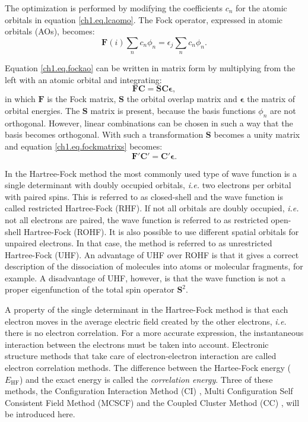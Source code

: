 The optimization is performed by modifying the coefficients $c_n$ for the atomic orbitals in equation \ref{ch1.eq.lcaomo}. The Fock operator, expressed in atomic orbitals (AOs), becomes:
\begin{equation}
\mathbf{F}(i)\sum_n c_n \phi_n = \epsilon_j \sum_n c_n \phi_n.
\label{ch1.eq.fockao}
\end{equation}

Equation \ref{ch1.eq.fockao} can be written in matrix form by multiplying from the left with an atomic orbital and integrating:
\begin{equation}
\mathbf{F}\mathbf{C} = \mathbf{S}\mathbf{C}\mathbf{\epsilon},
\label{ch1.eq.fockmatrixs}
\end{equation}
in which $\mathbf{F}$ is the Fock matrix, $\mathbf{S}$ the orbital overlap matrix and $\mathbf{\epsilon}$ the matrix of orbital energies. The $\mathbf{S}$ matrix is present, because the basis functions $\phi_n$ are not orthogonal. However, linear combinations can be chosen in such a way that the basis becomes orthogonal. With such a transformation $\mathbf{S}$ becomes a unity matrix and equation \ref{ch1.eq.fockmatrixs} becomes:
\begin{equation}
\mathbf{F'}\mathbf{C'} = \mathbf{C'}\mathbf{\epsilon}.
\end{equation}

In the Hartree-Fock method the most commonly used type of wave function is a single determinant with doubly occupied orbitals, \textit{i.e.} two electrons per orbital with paired spins. This is referred to as closed-shell and the wave function is called restricted Hartree-Fock (RHF). If not all orbitals are doubly occupied, \textit{i.e.} not all electrons are paired, the wave function is referred to as restricted open-shell Hartree-Fock (ROHF). It is also possible to use different spatial orbitals for unpaired electrons. In that case, the method is referred to as unrestricted Hartree-Fock (UHF). An advantage of UHF over ROHF is that it gives a correct description of the dissociation of molecules into atoms or molecular fragments, for example. A disadvantage of UHF, however, is that the wave function is not a proper eigenfunction of the total spin operator $\mathbf{S}^2$.

A property of the single determinant in the Hartree-Fock method is that each electron moves in the average electric field created by the other electrons, \textit{i.e.} there is no electron correlation. For a more accurate expression, the instantaneous interaction between the electrons must be taken into account. Electronic structure methods that take care of electron-electron interaction are called electron correlation methods. The difference between the Hartee-Fock energy ($E_\mathrm{HF}$) and the exact energy is called the \textit{correlation energy}. Three of these methods, the Configuration Interaction Method (CI) \cite{shavitt1,shavitt2}, Multi Configuration Self Consistent Field Method (MCSCF) \cite{daswahl,wahldasbook,mcscf,roos1,roos2} and the Coupled Cluster Method (CC) \cite{cc1,cc2}, will be introduced here.

